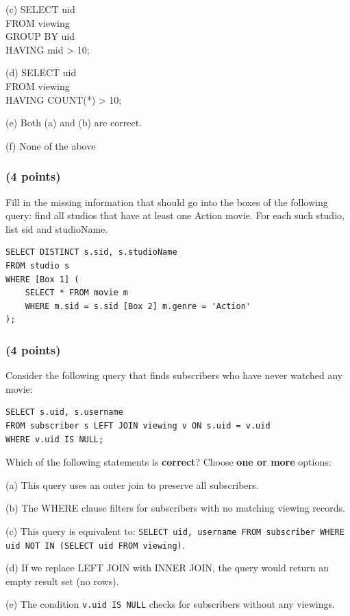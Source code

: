 \documentclass[11pt,a4paper]{article}
\begin{document}
(c) SELECT uid\\
\phantom{xxxx}FROM viewing\\
\phantom{xxxx}GROUP BY uid\\
\phantom{xxxx}HAVING mid > 10;

(d) SELECT uid\\
\phantom{xxxx}FROM viewing\\
\phantom{xxxx}HAVING COUNT(*) > 10;

(e) Both (a) and (b) are correct.

(f) None of the above

\subsubsection{(4 points)}
Fill in the missing information that should go into the boxes of the following query: find all studios that have at least one Action movie. For each such studio, list sid and studioName.

\begin{verbatim}
SELECT DISTINCT s.sid, s.studioName
FROM studio s
WHERE [Box 1] (
    SELECT * FROM movie m
    WHERE m.sid = s.sid [Box 2] m.genre = 'Action'
);
\end{verbatim}

\subsubsection{(4 points)}
Consider the following query that finds subscribers who have never watched any movie:

\begin{verbatim}
SELECT s.uid, s.username
FROM subscriber s LEFT JOIN viewing v ON s.uid = v.uid
WHERE v.uid IS NULL;
\end{verbatim}

Which of the following statements is \textbf{correct}? Choose \textbf{one or more} options:

(a) This query uses an outer join to preserve all subscribers.

(b) The WHERE clause filters for subscribers with no matching viewing records.

(c) This query is equivalent to: \texttt{SELECT uid, username FROM subscriber WHERE uid NOT IN (SELECT uid FROM viewing)}.

(d) If we replace LEFT JOIN with INNER JOIN, the query would return an empty result set (no rows).

(e) The condition \texttt{v.uid IS NULL} checks for subscribers without any viewings.
\end{document}
